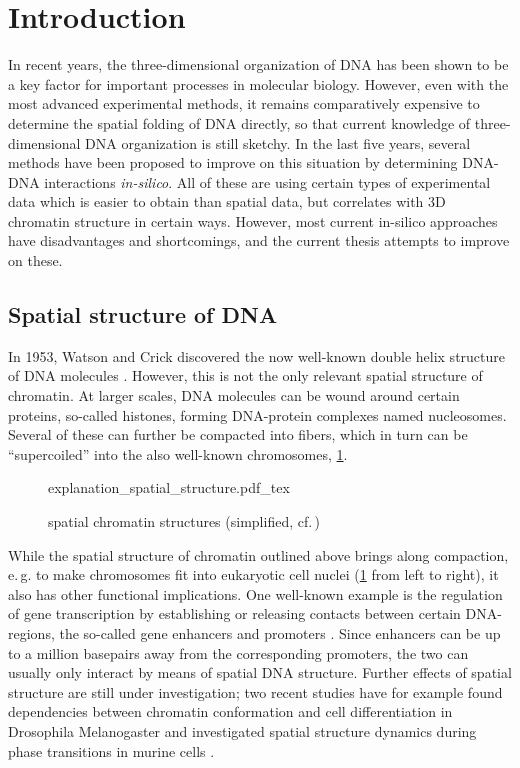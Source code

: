 %
\section{Introduction}
In recent years, the three-dimensional organization of DNA has been shown to 
be a key factor for important processes in molecular biology.
However, even with the most advanced experimental methods, 
it remains comparatively expensive to determine the spatial folding of DNA directly,
so that current knowledge of three-dimensional DNA organization is still sketchy.
In the last five years, several methods have been proposed to improve on this situation
by determining DNA-DNA interactions \emph{in-silico}.
All of these are using certain types of experimental data which is easier to obtain than spatial data, but correlates with 3D chromatin structure in certain ways.
However, most current in-silico approaches have disadvantages and shortcomings,
and the current thesis attempts to improve on these.

\subsection{Spatial structure of DNA}
In 1953, Watson and Crick discovered the now well-known double helix structure of DNA molecules \cite{Watson1953}.
However, this is not the only relevant spatial structure of chromatin. 
At larger scales, DNA molecules can be wound around certain proteins, so-called histones, forming DNA-protein complexes named nucleosomes.
Several of these can further be compacted into fibers, which in turn can be ``supercoiled'' into the also well-known chromosomes, \cref{fig:intro:spatial_chrom_structures}.
\begin{figure}[h!]
 \small
 \centering
 {explanation_spatial_structure.pdf_tex}
 \caption{spatial chromatin structures (simplified, cf.\,\cite{Lee2001})} \label{fig:intro:spatial_chrom_structures}
\end{figure}

While the spatial structure of chromatin outlined above brings along compaction, 
e.\,g. to make chromosomes fit into eukaryotic cell nuclei (\cref{fig:intro:spatial_chrom_structures} from left to right), 
it also has other functional implications.
One well-known example is the regulation of gene transcription by establishing or releasing contacts
between certain DNA-regions, the so-called gene enhancers and promoters \cite{Smallwood2013,Gorkin2014}.
Since enhancers can be up to a million basepairs away from the corresponding promoters, 
the two can usually only interact by means of spatial DNA structure.
Further effects of spatial structure are still under investigation;
two recent studies have for example found dependencies between chromatin conformation 
and cell differentiation in Drosophila Melanogaster \cite{Chathoth2019}
and investigated spatial structure dynamics during phase transitions in murine cells \cite{Zhang2019b}.

